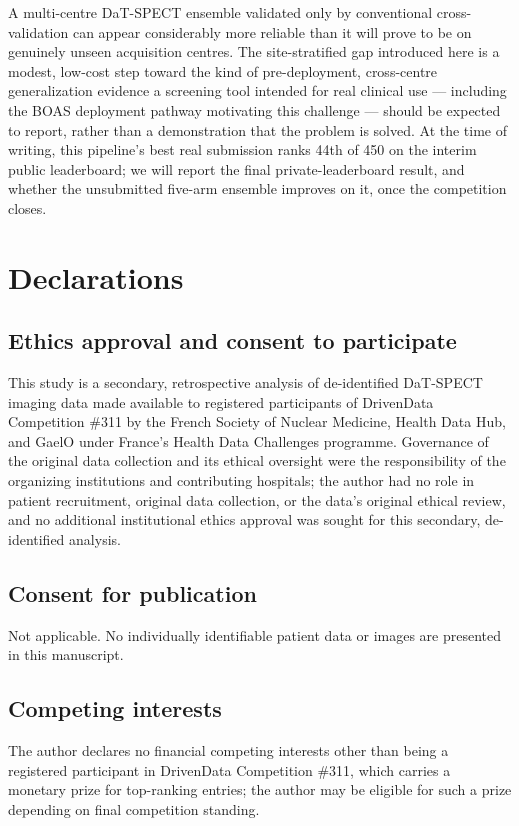 \documentclass[11pt]{article}
\begin{document}
A multi-centre DaT-SPECT ensemble validated only by conventional cross-validation can appear considerably more reliable than it will prove to be on genuinely unseen acquisition centres. The site-stratified gap introduced here is a modest, low-cost step toward the kind of pre-deployment, cross-centre generalization evidence a screening tool intended for real clinical use --- including the BOAS deployment pathway motivating this challenge --- should be expected to report, rather than a demonstration that the problem is solved. At the time of writing, this pipeline's best real submission ranks 44th of 450 on the interim public leaderboard; we will report the final private-leaderboard result, and whether the unsubmitted five-arm ensemble improves on it, once the competition closes.

\bigskip
\section*{Declarations}

\subsection*{Ethics approval and consent to participate}
This study is a secondary, retrospective analysis of de-identified DaT-SPECT imaging data made available to registered participants of DrivenData Competition \#311 by the French Society of Nuclear Medicine, Health Data Hub, and GaelO under France's Health Data Challenges programme. Governance of the original data collection and its ethical oversight were the responsibility of the organizing institutions and contributing hospitals; the author had no role in patient recruitment, original data collection, or the data's original ethical review, and no additional institutional ethics approval was sought for this secondary, de-identified analysis.

\subsection*{Consent for publication}
Not applicable. No individually identifiable patient data or images are presented in this manuscript.

\subsection*{Competing interests}
The author declares no financial competing interests other than being a registered participant in DrivenData Competition \#311, which carries a monetary prize for top-ranking entries; the author may be eligible for such a prize depending on final competition standing.
\end{document}
